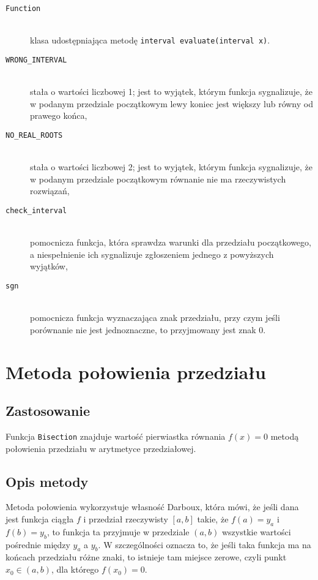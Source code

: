 \documentclass[12pt]{article}
\begin{document}
			\begin{description}
				\item[\texttt{Function}] \hfill\\
					klasa udostępniająca metodę \texttt{interval evaluate(interval x)}.
				\item[\texttt{WRONG\_INTERVAL}] \hfill\\
					stała o wartości liczbowej 1; jest to wyjątek, którym funkcja sygnalizuje, że w podanym przedziale początkowym lewy koniec jest większy lub równy od prawego końca,
				\item[\texttt{NO\_REAL\_ROOTS}] \hfill\\
					stała o wartości liczbowej 2; jest to wyjątek, którym funkcja sygnalizuje, że w podanym przedziale początkowym równanie nie ma rzeczywistych rozwiązań,
				\item[\texttt{check\_interval}] \hfill\\
					pomocnicza funkcja, która sprawdza warunki dla przedziału początkowego, a niespełnienie ich sygnalizuje zgłoszeniem jednego z powyższych wyjątków,
        \item[\texttt{sgn}] \hfill\\
					pomocnicza funkcja wyznaczająca znak przedziału, przy czym jeśli porównanie nie jest jednoznaczne, to przyjmowany jest znak 0.
			\end{description}


	\section{Metoda połowienia przedziału}
		\subsection{Zastosowanie}
			Funkcja \texttt{Bisection} znajduje wartość pierwiastka równania
			$f(x) = 0$ metodą połowienia przedziału w arytmetyce przedziałowej.

		\subsection{Opis metody}
			Metoda połowienia wykorzystuje własność Darboux, która mówi,
			że jeśli dana jest funkcja ciągła $f$ i przedział rzeczywisty $[a, b]$ takie,
			że $f(a) = y_a$ i $f(b) = y_b$, to funkcja ta przyjmuje w przedziale $(a, b)$
			wszystkie wartości pośrednie między $y_a$ a $y_b$.
			W szczególności oznacza to, że jeśli taka funkcja ma
			na końcach przedziału różne znaki, to istnieje tam miejsce zerowe,
			czyli punkt $x_0 \in (a, b)$, dla którego $f(x_0) = 0$.
\end{document}
